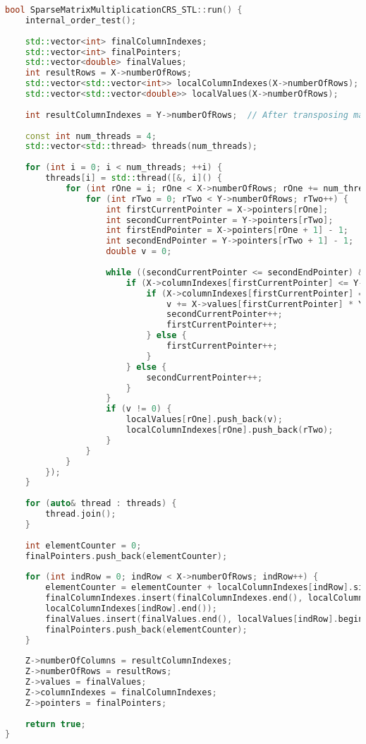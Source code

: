 \documentclass[a4paper, 14pt]{article}
\theoremstyle{plain}
\begin{document}
\begin{lstlisting}[language=C++,caption=Реализация метода run() в параллельной (STL) версии программы]
bool SparseMatrixMultiplicationCRS_STL::run() {
	internal_order_test();
	
	std::vector<int> finalColumnIndexes;
	std::vector<int> finalPointers;
	std::vector<double> finalValues;
	int resultRows = X->numberOfRows;
	std::vector<std::vector<int>> localColumnIndexes(X->numberOfRows);
	std::vector<std::vector<double>> localValues(X->numberOfRows);
	
	int resultColumnIndexes = Y->numberOfRows;  // After transposing matrix Y
	
	const int num_threads = 4;
	std::vector<std::thread> threads(num_threads);
	
	for (int i = 0; i < num_threads; ++i) {
		threads[i] = std::thread([&, i]() {
			for (int rOne = i; rOne < X->numberOfRows; rOne += num_threads) {
				for (int rTwo = 0; rTwo < Y->numberOfRows; rTwo++) {
					int firstCurrentPointer = X->pointers[rOne];
					int secondCurrentPointer = Y->pointers[rTwo];
					int firstEndPointer = X->pointers[rOne + 1] - 1;
					int secondEndPointer = Y->pointers[rTwo + 1] - 1;
					double v = 0;
					
					while ((secondCurrentPointer <= secondEndPointer) && (firstCurrentPointer <= firstEndPointer)) {
						if (X->columnIndexes[firstCurrentPointer] <= Y->columnIndexes[secondCurrentPointer]) {
							if (X->columnIndexes[firstCurrentPointer] == Y->columnIndexes[secondCurrentPointer]) {
								v += X->values[firstCurrentPointer] * Y->values[secondCurrentPointer];
								secondCurrentPointer++;
								firstCurrentPointer++;
							} else {
								firstCurrentPointer++;
							}
						} else {
							secondCurrentPointer++;
						}
					}
					if (v != 0) {
						localValues[rOne].push_back(v);
						localColumnIndexes[rOne].push_back(rTwo);
					}
				}
			}
		});
	}
	
	for (auto& thread : threads) {
		thread.join();
	}
	
	int elementCounter = 0;
	finalPointers.push_back(elementCounter);
	
	for (int indRow = 0; indRow < X->numberOfRows; indRow++) {
		elementCounter = elementCounter + localColumnIndexes[indRow].size();
		finalColumnIndexes.insert(finalColumnIndexes.end(), localColumnIndexes[indRow].begin(),
		localColumnIndexes[indRow].end());
		finalValues.insert(finalValues.end(), localValues[indRow].begin(), localValues[indRow].end());
		finalPointers.push_back(elementCounter);
	}
	
	Z->numberOfColumns = resultColumnIndexes;
	Z->numberOfRows = resultRows;
	Z->values = finalValues;
	Z->columnIndexes = finalColumnIndexes;
	Z->pointers = finalPointers;
	
	return true;
}
\end{lstlisting}
\end{document}
